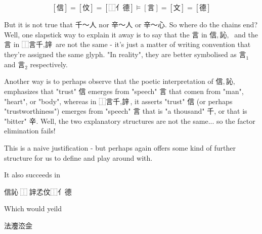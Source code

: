 $$[\text{信}]=[\text{伩}]=[\text{⿰亻德}]\models [\text{言}]=[\text{文}]=[\text{德}]$$






 But it is not true that 千～人 nor 辛～人 or 辛～心. 
 So where do the chains end?
 Well, one slapstick way to explain it away is to say that the 言 in $\text{信},\text{訫},\text{𬢭}$ and the 言 in $\text{⿰言千},\text{䛨}$ are not the same - it's just a matter of writing convention that they're assigned the same glyph. "In reality", they are better symbolised as $\text{言}_1$ and $\text{言}_2$ respectively. 

 Another way is to perhaps observe that the poetic interpretation of $\text{信},\text{訫},\text{𬢭}$ emphasizes that "trust" 信 emerges from "speech" 言 that comen from "man", "heart", or "body", whereas in $\text{⿰言千},\text{䛨}$, it asserts "trust" 信 (or perhaps "trustworthiness") emerges from "speech" 言 that is  "a thousand" 千, or that is "bitter" 辛. Well, the two explanatory structures are not the same... so the factor elimination fails! 

 This is a naive justification - but perhaps again offers some kind of further structure for us to define and play around with. 

 
 
 
 
 
 
 
 
 
 
 








It also succeeds in 

信訫𬢭⿰𲁢䛨孞伩⿰亻德

Which would yeild 

法灋㳒佱𫼒